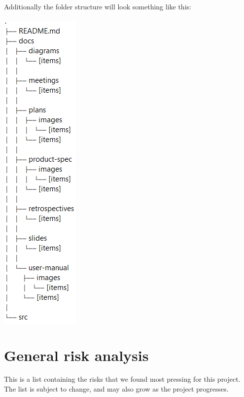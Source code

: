 \documentclass[12pt]{article}%
\begin{document}
\vspace{50mm}
\noindent
Additionally the folder structure will look something like this: \\ \\
\includegraphics[scale=1]{structure.png}
\vspace{50mm}

\section{General risk analysis}
This is a list containing the risks that we found most pressing for this project. The list is subject to change, and may also grow as the project progresses.
\vspace{5mm}
\end{document}
